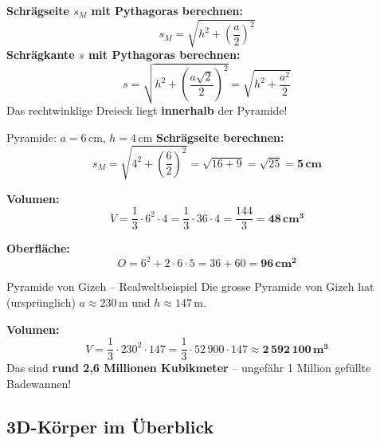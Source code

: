 \documentclass[12pt, a4paper]{article}
\begin{document}
\begin{tipbox}
\textbf{Schr\"agseite $s_M$ mit Pythagoras berechnen:}
\[
  s_M = \sqrt{h^2 + \left(\frac{a}{2}\right)^2}
\]
\textbf{Schr\"agkante $s$ mit Pythagoras berechnen:}
\[
  s = \sqrt{h^2 + \left(\frac{a\sqrt{2}}{2}\right)^2} = \sqrt{h^2 + \frac{a^2}{2}}
\]
Das rechtwinklige Dreieck liegt \textbf{innerhalb} der Pyramide!
\end{tipbox}

\begin{examplebox}{Pyramide: $a = 6$\,cm, $h = 4$\,cm}
\textbf{Schr\"agseite berechnen:}
\[
  s_M = \sqrt{4^2 + \left(\frac{6}{2}\right)^2} = \sqrt{16 + 9} = \sqrt{25} = \mathbf{5\,cm}
\]

\textbf{Volumen:}
\[
  V = \frac{1}{3} \cdot 6^2 \cdot 4 = \frac{1}{3} \cdot 36 \cdot 4 = \frac{144}{3} = \mathbf{48\,cm^3}
\]

\textbf{Oberfl\"ache:}
\[
  O = 6^2 + 2 \cdot 6 \cdot 5 = 36 + 60 = \mathbf{96\,cm^2}
\]
\end{examplebox}

\begin{examplebox}{Pyramide von Gizeh -- Realweltbeispiel}
Die grosse Pyramide von Gizeh hat (urspr\"unglich) $a \approx 230$\,m und $h \approx 147$\,m.

\textbf{Volumen:}
\[
  V = \frac{1}{3} \cdot 230^2 \cdot 147 = \frac{1}{3} \cdot 52\,900 \cdot 147 \approx \mathbf{2\,592\,100\,m^3}
\]
Das sind \textbf{rund 2,6 Millionen Kubikmeter} -- ungef\"ahr 1 Million gef\"ullte Badewannen!
\end{examplebox}

\subsection{3D-K\"orper im \"Uberblick}
\end{document}
